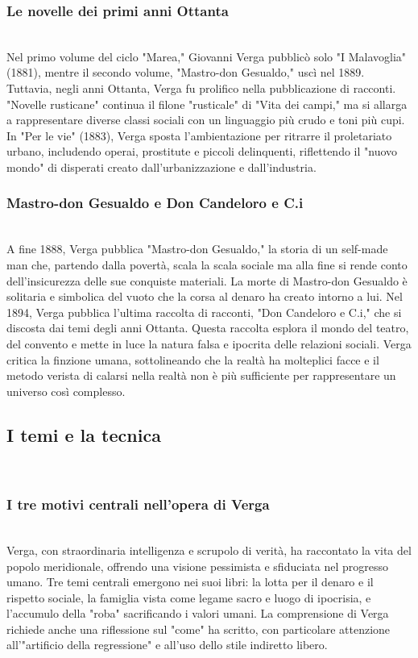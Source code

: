 \documentclass{report}
\begin{document}
\subsubsection{Le  novelle  dei  primi  anni  Ottanta}
\\
Nel primo volume del ciclo "Marea," Giovanni Verga pubblicò solo "I Malavoglia" (1881), mentre il secondo volume, "Mastro-don Gesualdo," uscì nel 1889. Tuttavia, negli anni Ottanta, Verga fu prolifico nella pubblicazione di racconti. "Novelle rusticane" continua il filone "rusticale" di "Vita dei campi," ma si allarga a rappresentare diverse classi sociali con un linguaggio più crudo e toni più cupi. In "Per le vie" (1883), Verga sposta l'ambientazione per ritrarre il proletariato urbano, includendo operai, prostitute e piccoli delinquenti, riflettendo il "nuovo mondo" di disperati creato dall'urbanizzazione e dall'industria.
\\
\subsubsection{Mastro-don  Gesualdo  e Don  Candeloro  e  C.i}
\\
A fine 1888, Verga pubblica "Mastro-don Gesualdo," la storia di un self-made man che, partendo dalla povertà, scala la scala sociale ma alla fine si rende conto dell'insicurezza delle sue conquiste materiali. La morte di Mastro-don Gesualdo è solitaria e simbolica del vuoto che la corsa al denaro ha creato intorno a lui. Nel 1894, Verga pubblica l'ultima raccolta di racconti, "Don Candeloro e C.i," che si discosta dai temi degli anni Ottanta. Questa raccolta esplora il mondo del teatro, del convento e mette in luce la natura falsa e ipocrita delle relazioni sociali. Verga critica la finzione umana, sottolineando che la realtà ha molteplici facce e il metodo verista di calarsi nella realtà non è più sufficiente per rappresentare un universo così complesso.
\\
\subsection{I temi e la tecnica}
\\
\subsubsection{I tre motivi centrali nell’opera di Verga}
\\
Verga, con straordinaria intelligenza e scrupolo di verità, ha raccontato la vita del popolo meridionale, offrendo una visione pessimista e sfiduciata nel progresso umano. Tre temi centrali emergono nei suoi libri: la lotta per il denaro e il rispetto sociale, la famiglia vista come legame sacro e luogo di ipocrisia, e l'accumulo della "roba" sacrificando i valori umani. La comprensione di Verga richiede anche una riflessione sul "come" ha scritto, con particolare attenzione all'"artificio della regressione" e all'uso dello stile indiretto libero.
\\
\end{document}
